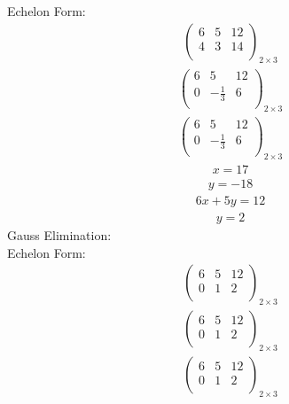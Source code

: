 \documentclass{article}
\begin{document}
Echelon Form:\\
\begin{align*}
\left(
\begin{array}{cc|c}
6 & 5 & 12\\
4 & 3 & 14\\
\end{array}
\right)_{2\times 3}
\end{align*}
\begin{align*}
\left(
\begin{array}{cc|c}
6 & 5 & 12\\
0 & -\frac{1}{3} & 6\\
\end{array}
\right)_{2\times 3}
\end{align*}
\begin{align*}
\left(
\begin{array}{cc|c}
6 & 5 & 12\\
0 & -\frac{1}{3} & 6\\
\end{array}
\right)_{2\times 3}
\end{align*}
\begin{align*}
x=17\end{align*}
\begin{align*}
y=-18\end{align*}
\begin{align*}
6x + 5y=12\end{align*}
\begin{align*}
y=2\end{align*}
Gauss Elimination:\\
Echelon Form:\\
\begin{align*}
\left(
\begin{array}{cc|c}
6 & 5 & 12\\
0 & 1 & 2\\
\end{array}
\right)_{2\times 3}
\end{align*}
\begin{align*}
\left(
\begin{array}{cc|c}
6 & 5 & 12\\
0 & 1 & 2\\
\end{array}
\right)_{2\times 3}
\end{align*}
\begin{align*}
\left(
\begin{array}{cc|c}
6 & 5 & 12\\
0 & 1 & 2\\
\end{array}
\right)_{2\times 3}
\end{align*}
\end{document}
